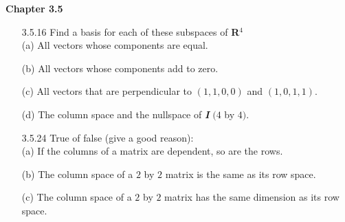 \documentclass[10pt,twoside,reqno]{article}
\begin{document}
\textbf{Chapter 3.5}
\begin{enumerate}
\item[3.5.16]  Find a basis for each of these subspaces of \textbf{R}$^4$\\
(a) All vectors whose components are equal.\\
\vspace{3mm}



(b) All vectors whose components add to zero.\\
\vspace{3mm}



(c) All vectors that are perpendicular to $(1, 1, 0, 0)$ and $(1, 0, 1, 1)$.\\
\vspace{3mm}



(d) The column space and the nullspace of \textit{\textbf{I}} $(4$ by $4)$.\\
\vspace{3mm}



\item[3.5.24] True of false (give a good reason):\\
(a) If the columns of a matrix are dependent, so are the rows.\\
\vspace{3mm} 



(b) The column space of a $2$ by $2$ matrix is the same as its row space.\\
\vspace{3mm} 



(c) The column space of a $2$ by $2$ matrix has the same dimension as its row space.\\
\vspace{3mm} 




\end{enumerate}
\end{document}
